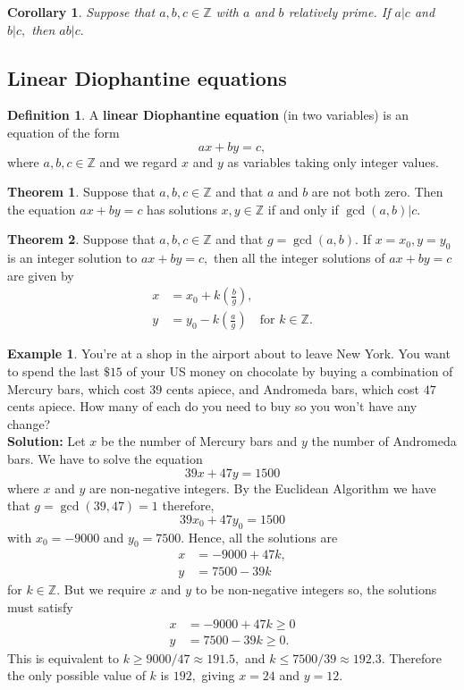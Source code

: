 \documentclass[12pt, a4paper]{article}
\newcommand{\bb}[1]{\mathbb{#1}}
\theoremstyle{definition}
\newtheorem{definition}{Definition}[section]
\newtheorem{theorem}{Theorem}[section]
\newtheorem*{example}{Example}
\theoremstyle{plain}
\newtheorem{corollary}{Corollary}[theorem]
\begin{document}
\begin{corollary}
Suppose that $a, b, c \in \bb{Z}$ with $a$ and $b$ relatively prime. If $a|c$ and $b|c,$ then $ab|c.$
\end{corollary}

\subsection{Linear Diophantine equations}

\begin{definition}
A \textbf{linear Diophantine equation} (in two variables) is an equation of the form $$ax + by = c,$$ where $a,b,c \in \bb{Z}$ and we regard $x$ and $y$ as variables taking only integer values. 
\end{definition}

\begin{theorem}
Suppose that $a, b, c \in \bb{Z}$ and that $a$ and $b$ are not both zero. Then the equation $ax+by = c$ has solutions $x,y \in \bb{Z}$ if and only if $\gcd(a,b)|c.$
\end{theorem}

\begin{theorem}
Suppose that $a, b, c \in \bb{Z}$ and that $g = \gcd(a, b).$ If $x = x_0, y = y_0$ is an integer solution to $ax + by = c,$ then all the integer solutions of $ax + by = c$ are given by 
$$\begin{aligned}
x&=x_0 +k\left(\frac{b}{g}\right), \\
y&=y_0-k\left(\frac{a}{g}\right) \quad \text{for } k\in \bb{Z}.
\end{aligned}$$
\end{theorem}

\begin{example}
You’re at a shop in the airport about to leave New York. You want to spend the last $\$15$ of your US money on chocolate by buying a combination of Mercury bars, which cost $39$ cents apiece, and Andromeda bars, which cost $47$ cents apiece. How many of each do you need to buy so you won’t have any change? \\
\textbf{Solution:} Let $x$ be the number of Mercury bars and $y$ the number of Andromeda bars. We have to solve the equation 
$$39x+47y=1500$$ where $x$ and $y$ are non-negative integers. By the Euclidean Algorithm we have that $g=\gcd(39,47)=1$ therefore, 
$$39x_0+47y_0=1500$$ with $x_0=-9000$ and $y_0=7500.$ Hence, all the solutions are 
$$\begin{aligned}
x&=-9000+47k,\\
y&=7500-39k
\end{aligned}$$ for $k\in\bb{Z}.$ But we require $x$ and $y$ to be non-negative integers so, the solutions must satisfy 
$$\begin{aligned}
x&=-9000+47k\geq0 \\ 
y&=7500-39k\geq0.
\end{aligned}$$ 
This is equivalent to $k \geq 9000/47 \approx 191.5,$ and $k \leq 7500/39 \approx 192.3.$ Therefore the only possible value of $k$ is $192,$ giving $x=24$ and $y=12.$
\end{example}
\end{document}
